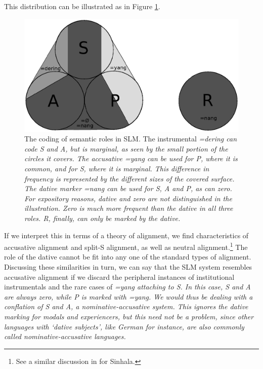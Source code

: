 This distribution can be illustrated as in Figure \ref{fig:argstr}.


\begin{figure}
 \centering
 \includegraphics[height=.3\textheight]{pics/sap-slm.eps}
 \caption[Coding of semantic roles in SLM]{The coding of semantic roles in SLM. The instrumental \em =dering \em can code S and A, but is marginal, as seen by the small portion of the circles it covers. The accusative \em =yang \em can be used for P, where it is common, and for S, where it is marginal. This difference in frequency is represented by the different sizes of the covered surface. The dative marker \em =nang \em can be used for S, A and P, as can zero. For expository reasons, dative and zero are not distinguished in the illustration. Zero is much more frequent than the dative in all three roles. R, finally, can only be marked by the dative.}
 \label{fig:argstr}
\end{figure}


If we interpret this in terms of a theory of alignment, we find characteristics of accusative alignment and split-S alignment, as well as neutral alignment.\footnote{See a similar discussion in \citet[19f]{Gair1991infl} for Sinhala.}
The role of the dative cannot be fit into any one of the standard types of alignment. Discussing these similarities in turn, we can say that the SLM system resembles accusative alignment if we discard the peripheral instances of institutional instrumentals and the rare cases of \em =yang \em attaching to S. In this case, S and A are always zero, while P is marked with \em =yang\em. We would  thus be dealing with a conflation of S and A, a nominative-accusative system. This ignores the dative marking for modals and experiencers, but this need not be a problem, since other languages with `dative subjects', like German for instance, are also commonly called nominative-accusative languages.

